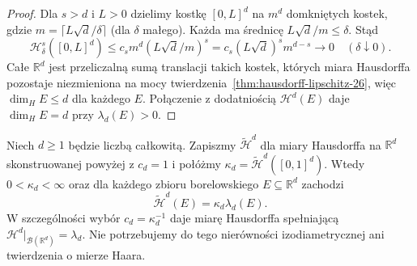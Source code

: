 \begin{proof}
Dla $s>d$ i $L>0$ dzielimy kostkę $[0,L]^d$
na $m^d$ domkniętych kostek, gdzie
$m=\lceil L\sqrt d/\delta\rceil$ (dla $\delta$ małego).
Każda ma średnicę $L\sqrt d/m\le\delta$.
Stąd
\[
 \mathcal H^s_\delta([0,L]^d)
 \le c_s m^d(L\sqrt d/m)^s
 =c_s(L\sqrt d)^s m^{d-s}\longrightarrow0
 \quad(\delta\downarrow0).
\]
Całe $\mathbb R^d$ jest przeliczalną sumą translacji takich
kostek, których miara Hausdorffa pozostaje niezmieniona
na mocy twierdzenia~\ref{thm:hausdorff-lipschitz-26}, więc $\dim_HE\le d$ dla każdego $E$.
Połączenie z dodatniością $\mathcal H^d(E)$ daje
$\dim_HE=d$ przy $\lambda_d(E)>0$.
\end{proof}

\begin{twierdzenie}
\label{thm:hausdorff-calibration-26}
Niech $d\ge1$ będzie liczbą całkowitą. Zapiszmy
$\widetilde{\mathcal H}^{d}$ dla miary Hausdorffa
na $\mathbb R^d$ skonstruowanej powyżej z $c_d=1$
i połóżmy $\kappa_d=\widetilde{\mathcal H}^{d}([0,1]^d)$.
Wtedy $0<\kappa_d<\infty$ oraz dla każdego
zbioru borelowskiego $E\subseteq\mathbb R^d$
zachodzi
\[
 \widetilde{\mathcal H}^{d}(E)=\kappa_d\lambda_d(E).
\]
W szczególności wybór $c_d=\kappa_d^{-1}$ daje
miarę Hausdorffa spełniającą
$\mathcal H^d|_{\mathcal B(\mathbb R^d)}=\lambda_d$.
Nie potrzebujemy do tego nierówności izodiametrycznej
ani twierdzenia o mierze Haara.
\end{twierdzenie}
